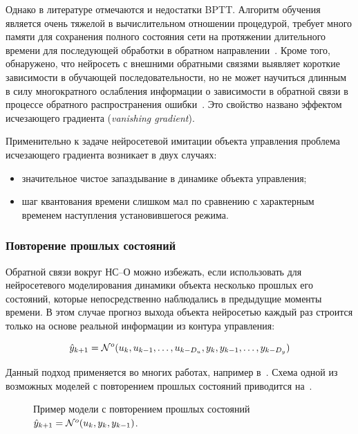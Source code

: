 Однако в литературе отмечаются и недостатки BPTT.  Алгоритм обучения
является очень тяжелой в вычислительном отношении процедурой, требует
много памяти для сохранения полного состояния сети на протяжении
длительного времени для последующей обработки в обратном
направлении~\cite{levinar95}.  Кроме того, обнаружено, что нейросеть с
внешними обратными связями выявляет короткие зависимости в обучающей
последовательности, но не может научиться длинным в силу многократного
ослабления информации о зависимости в обратной связи в процессе
обратного распространения ошибки~\cite{linetal}.  Это свойство названо
эффектом исчезающего градиента ({\em vanishing gradient}).

Применительно к задаче нейросетевой имитации объекта управления
проблема исчезающего градиента возникает в двух случаях:
\begin{itemize}\label{simple-feedback-defects}
  \item значительное чистое запаздывание в динамике объекта
  управления;
  \item шаг квантования времени слишком мал по сравнению с
  характерным временем наступления установившегося режима.
\end{itemize}

\subsubsection{Повторение прошлых состояний}

Обратной связи вокруг НС--О можно избежать, если использовать для
нейросетевого моделирования динамики объекта несколько прошлых его
состояний, которые непосредственно наблюдались в предыдущие моменты
времени.  В этом случае прогноз выхода объекта нейросетью каждый раз
строится только на основе реальной информации из контура управления:

\begin{equation}\label{eq:past-states}
  \hat{y}_{k+1}=\NN^o(u_k, u_{k-1},\ldots,u_{k-D_u}, y_k,
                           y_{k-1},\ldots, y_{k-D_y})
\end{equation}

Данный подход применяется во многих работах, например
в~\cite{kulee96}\cite{levinar95}.  Схема одной из возможных моделей с
повторением прошлых состояний приводится
на~.

\begin{figure}[h]
  \centering
  
  \caption{Пример модели с повторением прошлых состояний
  $\hat{y}_{k+1}=\mathcal{N}^o(u_k, y_k, y_{k-1})$.}
  \label{fig:nnp-past-states}
\end{figure}


